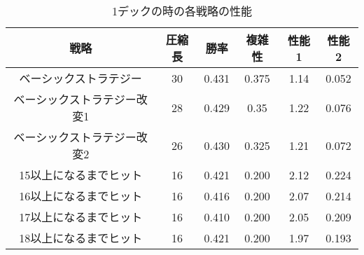 
\begin{table}[H]
\caption{1デックの時の各戦略の性能}
\label{table:data_type}
\begin{center}
\begin{tabular}{|c|c|c|c|c|c|}
\hline
戦略           & 圧縮長 & 勝率    & 複雑性   & 性能1  & 性能2   \\ \hline
ベーシックストラテジー         & 30  & 0.431 & 0.375 & 1.14 & 0.052 \\ \hline
ベーシックストラテジー改変1      & 28  & 0.429 & 0.35  & 1.22 & 0.076 \\ \hline
ベーシックストラテジー改変2      & 26  & 0.430 & 0.325 & 1.21 & 0.072 \\ \hline
15以上になるまでヒット & 16  & 0.421 & 0.200 & 2.12 & 0.224 \\ \hline
16以上になるまでヒット & 16  & 0.416 & 0.200 & 2.07 & 0.214 \\ \hline
17以上になるまでヒット & 16  & 0.410 & 0.200 & 2.05 & 0.209 \\ \hline
18以上になるまでヒット & 16  & 0.421 & 0.200 & 1.97 & 0.193 \\ \hline
\end{tabular}
\end{center}
\end{table}



